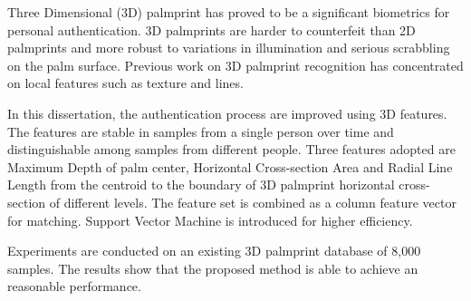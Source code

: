 
Three Dimensional (3D) palmprint has proved to be a significant biometrics for personal authentication. 3D palmprints are harder to counterfeit than 2D palmprints and more robust to variations in illumination and serious scrabbling on the palm surface. Previous work on 3D palmprint recognition has concentrated on local features such as texture and lines.

In this dissertation, the authentication process are improved using 3D features. The features are stable in samples from a single person over time and distinguishable among samples from different people. Three features adopted are Maximum Depth of palm center, Horizontal Cross-section Area and Radial Line Length from the centroid to the boundary of 3D palmprint horizontal cross-section of different levels. The feature set is combined as a column feature vector for matching. Support Vector Machine is introduced for higher efficiency.

Experiments are conducted on an existing 3D palmprint database of 8,000 samples. The results show that the proposed method is able to achieve an reasonable performance.



